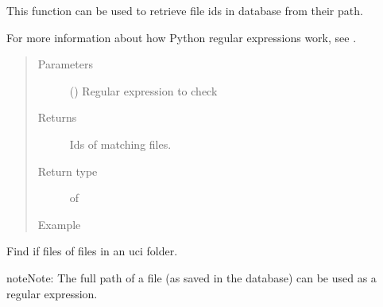 \documentclass[letterpaper,10pt,english]{sphinxmanual}
\begin{document}
\begin{fulllineitems}
\label{\detokenize{load:loacore.load.file_load.get_id_files_by_file_path}}
This function can be used to retrieve file ids in database from their path.

For more information about how Python regular expressions work, see  .
\begin{quote}\begin{description}
\item[{Parameters}] \leavevmode
{} () \textendash{} Regular expression to check

\item[{Returns}] \leavevmode
Ids of matching files.

\item[{Return type}] \leavevmode
{} of 

\item[{Example}] \leavevmode
\end{description}\end{quote}

Find if files of files in an uci folder.

%
\begin{sphinxVerbatim}[commandchars=\\\{\}]
   
  
\end{sphinxVerbatim}

\begin{sphinxadmonition}{note}{Note:}
The full path of a file (as saved in the database) can be used as a regular expression.
\end{sphinxadmonition}

\end{fulllineitems}
\end{document}
